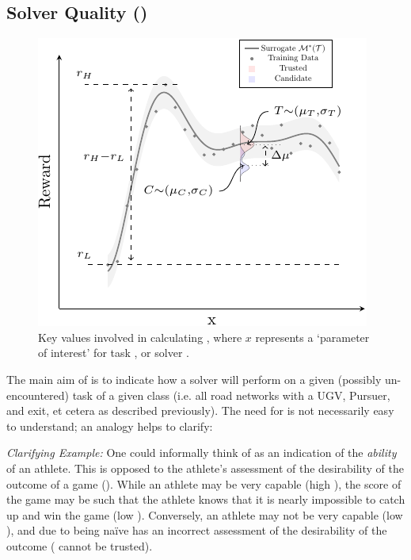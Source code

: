 \subsection{Solver Quality (\xQ)} \label{sec:SQ}
   \begin{figure}[tb]
        \centering
        \includegraphics[width=0.6\linewidth]{Figures/sq_v2_fig-crop}
        \caption{Key values involved in calculating \xQ, where $x$ represents a `parameter of interest' for task \task, or solver \solve.}
        \label{fig:sq_v2}
    \end{figure}
    The main aim of \xQ{} is to indicate how a solver \solve{} will perform on a given (possibly un-encountered) task \task{} of a given class \taskclass{} (i.e. all road networks with a UGV, Pursuer, and exit, et cetera as described previously). The need for \xQ{} is not necessarily easy to understand; an analogy helps to clarify:
    
    \emph{Clarifying Example:} One could informally think of \xQ{} as an indication of the \emph{ability} of an athlete. This is opposed to the athlete's assessment of the desirability of the outcome of a game (\xO). While an athlete may be very capable (high \xQ), the score of the game may be such that the athlete knows that it is nearly impossible to catch up and win the game (low \xO). Conversely, an athlete may not be very capable (low \xQ), and due to being na\"{i}ve has an incorrect assessment of the desirability of the outcome (\xO{} cannot be trusted).
    

